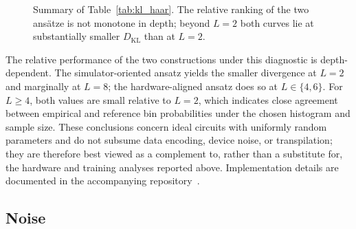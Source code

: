 \documentclass[11pt]{article}
\begin{document}
\begin{figure}[htbp]
    \centering
    \caption{Summary of Table~\ref{tab:kl_haar}. The relative ranking of the two ansätze is not monotone in depth; beyond $L=2$ both curves lie at substantially smaller $D_{\mathrm{KL}}$ than at $L=2$.}
    \label{fig:kl_haar_depth}
\end{figure}

The relative performance of the two constructions under this diagnostic is depth-dependent. The simulator-oriented ansatz yields the smaller divergence at $L=2$ and marginally at $L=8$; the hardware-aligned ansatz does so at $L\in\{4,6\}$. For $L\ge 4$, both values are small relative to $L=2$, which indicates close agreement between empirical and reference bin probabilities under the chosen histogram and sample size. These conclusions concern ideal circuits with uniformly random parameters and do not subsume data encoding, device noise, or transpilation; they are therefore best viewed as a complement to, rather than a substitute for, the hardware and training analyses reported above. Implementation details are documented in the accompanying repository~\cite{qc1repo}.

\subsection{Noise}
\end{document}
